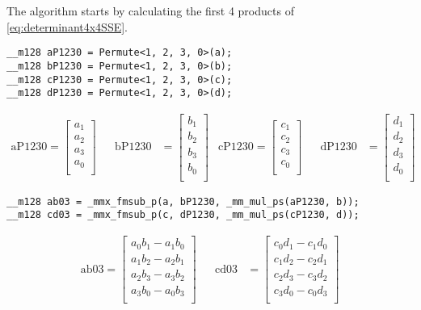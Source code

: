 The algorithm starts by calculating the first 4 products of \cref{eq:determinant4x4SSE}.


\begin{verbatim}
__m128 aP1230 = Permute<1, 2, 3, 0>(a);
__m128 bP1230 = Permute<1, 2, 3, 0>(b);
__m128 cP1230 = Permute<1, 2, 3, 0>(c);
__m128 dP1230 = Permute<1, 2, 3, 0>(d);
\end{verbatim}

\begin{align*}
\mathrm{aP1230} 
=
\begin{bmatrix}
a_1\\
a_2\\
a_3\\
a_0\\
\end{bmatrix}
&&
\mathrm{bP1230} 
&=
\begin{bmatrix}
b_1\\
b_2\\
b_3\\
b_0\\
\end{bmatrix}
&
\mathrm{cP1230} 
=
\begin{bmatrix}
c_1\\
c_2\\
c_3\\
c_0\\
\end{bmatrix}
&&
\mathrm{dP1230} 
&=
\begin{bmatrix}
d_1\\
d_2\\
d_3\\
d_0\\
\end{bmatrix}
\end{align*}

\begin{verbatim}
__m128 ab03 = _mmx_fmsub_p(a, bP1230, _mm_mul_ps(aP1230, b));
__m128 cd03 = _mmx_fmsub_p(c, dP1230, _mm_mul_ps(cP1230, d));
\end{verbatim}


\begin{align*}
\mathrm{ab03} 
=
\begin{bmatrix}
a_0b_1 - a_1b_0\\
a_1b_2 - a_2b_1\\
a_2b_3 - a_3b_2\\
a_3b_0 - a_0b_3\\
\end{bmatrix}
&&
\mathrm{cd03} 
&=
\begin{bmatrix}
c_0d_1 - c_1d_0\\
c_1d_2 - c_2d_1\\
c_2d_3 - c_3d_2\\
c_3d_0 - c_0d_3\\
\end{bmatrix}
\end{align*}


